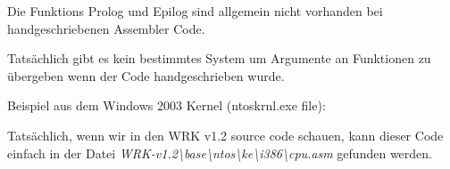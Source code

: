 \par Die Funktions Prolog und Epilog sind allgemein nicht vorhanden bei handgeschriebenen Assembler Code.

\par Tats\"achlich gibt es kein bestimmtes System um Argumente an Funktionen zu \"ubergeben wenn der Code handgeschrieben wurde. 

\par Beispiel aus dem Windows 2003 Kernel (ntoskrnl.exe file):



Tats\"achlich, wenn wir in den \ac{WRK} v1.2 source code schauen, kann dieser Code einfach in der Datei
\emph{WRK-v1.2\textbackslash{}base\textbackslash{}ntos\textbackslash{}ke\textbackslash{}i386\textbackslash{}cpu.asm} gefunden werden.


